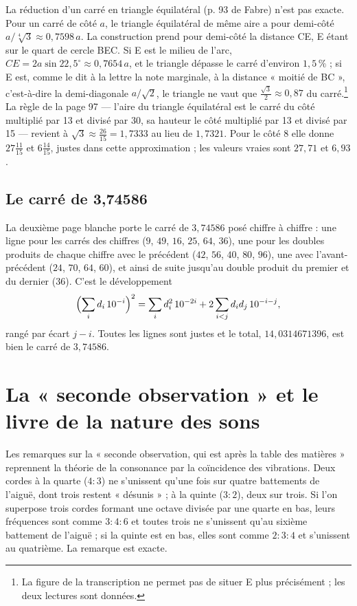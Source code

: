 \documentclass[11pt,a4paper]{article}
\begin{document}
La réduction d'un carré en triangle équilatéral (p. 93 de Fabre) n'est pas
exacte. Pour un carré de côté $a$, le triangle équilatéral de même aire a pour
demi-côté $a/\sqrt[4]{3} \approx 0{,}7598\,a$. La construction prend pour
demi-côté la distance CE, E étant sur le quart de cercle BEC. Si E est le
milieu de l'arc, $CE = 2a\sin 22{,}5^\circ \approx 0{,}7654\,a$, et le triangle
dépasse le carré d'environ $1{,}5\,\%$ ; si E est, comme le dit à la lettre la
note marginale, à la distance « moitié de BC », c'est-à-dire la
demi-diagonale $a/\sqrt2$, le triangle ne vaut que $\frac{\sqrt3}{2} \approx
0{,}87$ du carré.\footnote{La figure de la transcription ne permet pas de
situer E plus précisément ; les deux lectures sont données.} La règle de la page
97 — l'aire du triangle équilatéral est le carré du côté multiplié par 13 et
divisé par 30, sa hauteur le côté multiplié par 13 et divisé par 15 — revient à
$\sqrt3 \approx \frac{26}{15} = 1{,}7333$ au lieu de $1{,}7321$. Pour le côté 8
elle donne $27\frac{11}{15}$ et $6\frac{14}{15}$, justes dans cette
approximation ; les valeurs vraies sont $27{,}71$ et $6{,}93$.

\subsection*{Le carré de 3,74586}

La deuxième page blanche porte le carré de $3{,}74586$ posé chiffre à chiffre :
une ligne pour les carrés des chiffres ($9$, $49$, $16$, $25$, $64$, $36$), une pour les
doubles produits de chaque chiffre avec le précédent ($42$, $56$, $40$, $80$, $96$), une
avec l'avant-précédent ($24$, $70$, $64$, $60$), et ainsi de suite jusqu'au double
produit du premier et du dernier ($36$). C'est le développement
\[
\Bigl(\sum_i d_i\,10^{-i}\Bigr)^2 = \sum_i d_i^2\,10^{-2i}
  + 2\sum_{i<j} d_i d_j\,10^{-i-j},
\]
rangé par écart $j - i$. Toutes les lignes sont justes et le total,
$14{,}0314671396$, est bien le carré de $3{,}74586$.

\section*{La « seconde observation » et le livre de la nature des sons}

Les remarques sur la « seconde observation, qui est après la table des
matières » reprennent la théorie de la consonance par la coïncidence des
vibrations. Deux cordes à la quarte ($4 : 3$) ne s'unissent qu'une fois sur
quatre battements de l'aiguë, dont trois restent « désunis » ; à la quinte
($3 : 2$), deux sur trois. Si l'on superpose trois cordes formant une octave
divisée par une quarte en bas, leurs fréquences sont comme $3 : 4 : 6$ et
toutes trois ne s'unissent qu'au sixième battement de l'aiguë ; si la quinte
est en bas, elles sont comme $2 : 3 : 4$ et s'unissent au quatrième. La
remarque est exacte.
\end{document}
